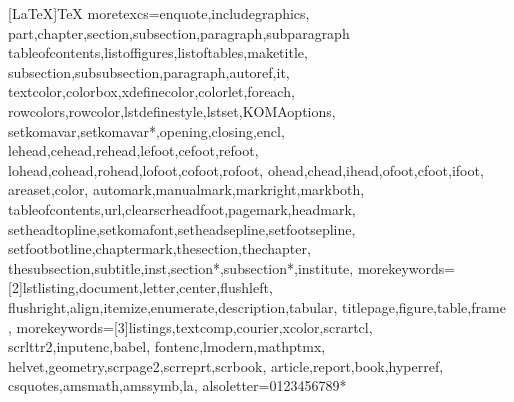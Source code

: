 
\usepackage[utf8]{inputenc}
\usepackage[T1]{fontenc}

\usepackage{aurical}
\usepackage{mathptmx}
\usepackage[scaled]{helvet}
\usepackage{lmodern}
\usepackage{textcomp}
\usepackage[scaled=.88]{DejaVuSansMono}

\usepackage[ngerman]{babel}
\usepackage[german=guillemets]{csquotes}

\usepackage{amsmath}
\usepackage{nicefrac}

\usepackage{tikz}
\usetikzlibrary{positioning,%
  shapes.geometric,%
  shapes.misc,%
  calc,%
  fit,%
  decorations,%
  decorations.pathreplacing,%
  backgrounds,%
  arrows,%
  automata,%
  trees%
}

\usepackage{pifont}
\newcommand{\goodmark}{\textcolor<presentation>{green!50!black}{\Pisymbol{pzd}{52}}}
\newcommand{\badmark}{\textcolor<presentation>{red}{\Pisymbol{pzd}{56}}}



\usepackage{listings}
[LaTeX]{TeX}%
  {moretexcs={enquote,includegraphics,%
    part,chapter,section,subsection,paragraph,subparagraph%
    tableofcontents,listoffigures,listoftables,maketitle,%
    subsection,subsubsection,paragraph,autoref,it,%
    textcolor,colorbox,xdefinecolor,colorlet,foreach,%
    rowcolors,rowcolor,lstdefinestyle,lstset,KOMAoptions,%
    setkomavar,setkomavar*,opening,closing,encl,%
    lehead,cehead,rehead,lefoot,cefoot,refoot,%
    lohead,cohead,rohead,lofoot,cofoot,rofoot,%
    ohead,chead,ihead,ofoot,cfoot,ifoot,%
    areaset,color,%
    automark,manualmark,markright,markboth,%
    tableofcontents,url,clearscrheadfoot,pagemark,headmark,%
    setheadtopline,setkomafont,setheadsepline,setfootsepline,%
    setfootbotline,chaptermark,thesection,thechapter,%
    thesubsection,subtitle,inst,section*,subsection*,institute},%
  morekeywords={[2]lstlisting,document,letter,center,flushleft,%
    flushright,align,itemize,enumerate,description,tabular,
    titlepage,figure,table,frame%
    },%
  morekeywords={[3]listings,textcomp,courier,xcolor,scrartcl,%
    scrlttr2,inputenc,babel,%
    fontenc,lmodern,mathptmx,%
    helvet,geometry,scrpage2,scrreprt,scrbook,%
    article,report,book,hyperref,%
    csquotes,amsmath,amssymb,la},
  alsoletter={0123456789*}
  }%

